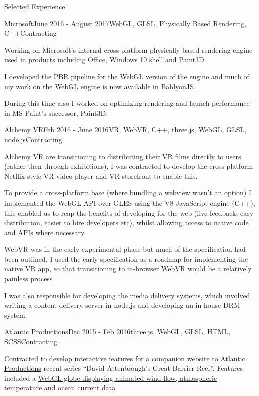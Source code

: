 \documentclass{resume} %
\begin{document}
\begin{rSection}{Selected Experience}
\begin{rSubsection}{Microsoft}{June 2016 - August 2017}{WebGL, GLSL, Physically Based Rendering, C++}{Contracting}
\item Working on Microsoft's internal cross-platform physically-based rendering engine used in products including Office, Windows 10 shell and Paint3D.
\item I developed the PBR pipeline for the WebGL version of the engine and much of my work on the WebGL engine is now available in \href{https://www.babylonjs.com/demos/pbrglossy/}{BablyonJS}.
\item During this time also I worked on optimizing rendering and launch performance in MS Paint's successor, Paint3D.
\end{rSubsection}

\begin{rSubsection}{Alchemy VR}{Feb 2016 - June 2016}{VR, WebVR, C++, three.js, WebGL, GLSL, node.js}{Contracting}
\item \href{http://www.alchemyvr.com/}{Alchemy VR} are transitioning to distributing their VR films directly to users (rather then through exhibitions), I was contracted to develop the cross-platform Netflix-style VR video player and VR storefront to enable this.
\item To provide a cross-platform base (where bundling a webview wasn't an option) I implemented the WebGL API over GLES using the V8 JavaScript engine (C++), this enabled us to reap the benefits of developing for the web (live feedback, easy distribution, easier to hire developers etc), whilst allowing access to native code and APIs where necessary.
\item WebVR was in the early experimental phase but much of the specification had been outlined. I used the early specification as a roadmap for implementing the native VR app, so that transitioning to in-browser WebVR would be a relatively painless process
\item I was also responsible for developing the media delivery systems, which involved writing a content delivery server in node.js and developing an in-house DRM system.
\end{rSubsection}

\begin{rSubsection}{Atlantic Productions}{Dec 2015 - Feb 2016}{three.js, WebGL, GLSL, HTML, SCSS}{Contracting}
\item Contracted to develop interactive features for a companion website to \href{http://www.atlanticproductions.tv/}{Atlantic Productions} recent series ``David Attenbrough's Great Barrier Reef''. Features included a \href{http://haxiomic.github.io/demos/webgl-earth-v4/}{WebGL globe displaying animated wind flow, atmospheric temperature and ocean current data}
\end{rSubsection}


\end{rSection}
\end{document}
